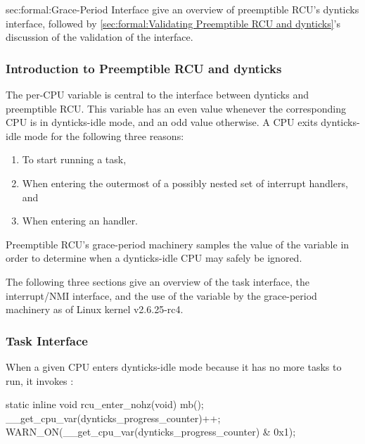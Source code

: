{sec:formal:Grace-Period Interface}
give an overview of preemptible RCU's dynticks interface,
followed by
\cref{sec:formal:Validating Preemptible RCU and dynticks}'s
discussion of the validation of the interface.

\subsubsection{Introduction to Preemptible RCU and dynticks}
\label{sec:formal:Introduction to Preemptible RCU and dynticks}

The per-CPU  variable is
central to the interface between dynticks and preemptible RCU\@.
This variable has an even value whenever the corresponding CPU
is in dynticks-idle mode, and an odd value otherwise.
A CPU exits dynticks-idle mode for the following three reasons:

\begin{enumerate}
\item	To start running a task,
\item	When entering the outermost of a possibly nested set of interrupt
	handlers, and
\item	When entering an  handler.
\end{enumerate}

Preemptible RCU's grace-period machinery samples the value of
the  variable in order to
determine when a dynticks-idle CPU may safely be ignored.

The following three sections give an overview of the task
interface, the interrupt/NMI interface, and the use of
the  variable by the
grace-period machinery as of Linux kernel v2.6.25-rc4.

\subsubsection{Task Interface}
\label{sec:formal:Task Interface}

When a given CPU enters dynticks-idle mode because it has no more
tasks to run, it invokes :

\begin{VerbatimN}
static inline void rcu_enter_nohz(void)
{
	mb();
	__get_cpu_var(dynticks_progress_counter)++;
	WARN_ON(__get_cpu_var(dynticks_progress_counter) &
	        0x1);
}
\end{VerbatimN}

